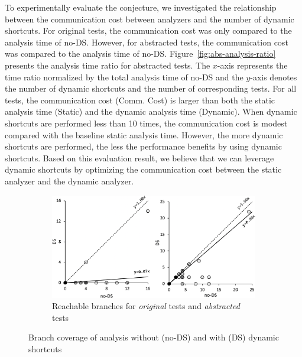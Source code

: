 To experimentally evaluate the conjecture, we investigated the relationship between
the communication cost between analyzers and the number of dynamic shortcuts.
For  original tests, the communication cost was only
 compared to the analysis time of no-DS.  However, for 
abstracted tests, the communication cost was  compared to the analysis
time of no-DS.  Figure~\ref{fig:abs-analysis-ratio} presents the
analysis time ratio for  abstracted tests.
The $x$-axis represents the time ratio normalized by the total analysis time of
no-DS and the $y$-axis denotes the number of dynamic
shortcuts and the number of corresponding tests.
For all  tests, the communication cost (Comm. Cost) is larger than
both the static analysis time (Static) and the dynamic analysis
time (Dynamic).  When dynamic shortcuts are performed less than 10 times,
the communication cost is modest compared with the baseline static
analysis time.  However, the more dynamic shortcuts are performed,
the less the performance benefits by using dynamic shortcuts.
Based on this evaluation result, we believe that we can leverage
dynamic shortcuts by optimizing the communication cost between
the static analyzer and the dynamic analyzer.

\begin{figure}[t]
  \centering
  \begin{subfigure}[t]{0.48\textwidth}
    \includegraphics[width=\linewidth]{img/precision}
    \vspace*{-1.5em}
    \caption{Reachable branches for  \textit{original} tests and  \textit{abstracted} tests}
    \label{fig:precision-fail}
  \end{subfigure}
  \vspace*{-1em}
  \caption{Branch coverage of analysis without (no-DS) and with (DS) dynamic shortcuts}
  \label{fig:precision}
  \vspace*{-1.5em}
\end{figure}




